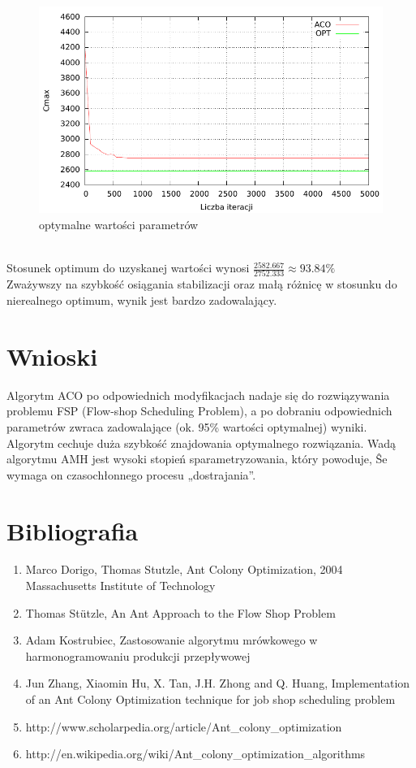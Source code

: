 \documentclass[10pt,a4paper]{article}
\begin{document}
\begin{figure}[h]
    \centering
    \includegraphics{./figures/inst_01_rnd_final_smooth.pdf}
    \caption{optymalne wartości parametrów}
\end{figure}
\vspace{2cm}
\\
Stosunek optimum do uzyskanej wartości wynosi $ \frac{2582.667}{2752.333}
\approx 93.84\% $\\ Zważywszy na szybkość osiągania stabilizacji oraz małą
różnicę w stosunku do nierealnego optimum, wynik jest bardzo zadowalający.

\newpage
\section{Wnioski}
Algorytm ACO po odpowiednich modyfikacjach nadaje się do rozwiązywania problemu
FSP (Flow-shop Scheduling Problem), a po dobraniu odpowiednich parametrów
zwraca zadowalające (ok. 95\% wartości optymalnej) wyniki. Algorytm cechuje
duża szybkość znajdowania optymalnego rozwiązania. Wadą algorytmu AMH jest
wysoki stopień sparametryzowania, który powoduje, Ŝe wymaga on czasochłonnego
procesu „dostrajania”.

\vspace{2,5cm}
\section{Bibliografia}
\begin{enumerate}
  \item Marco Dorigo, Thomas Stutzle, Ant Colony Optimization, 2004
    Massachusetts Institute of Technology
  \item Thomas Stützle, An Ant Approach to the Flow Shop Problem
  \item Adam Kostrubiec, Zastosowanie algorytmu mrówkowego w harmonogramowaniu
    produkcji przepływowej
  \item Jun Zhang, Xiaomin Hu, X. Tan, J.H. Zhong and Q. Huang, Implementation
    of an Ant Colony Optimization technique for job shop scheduling problem
  \item http://www.scholarpedia.org/article/Ant\_colony\_optimization
  \item http://en.wikipedia.org/wiki/Ant\_colony\_optimization\_algorithms
\end{enumerate}
\end{document}
